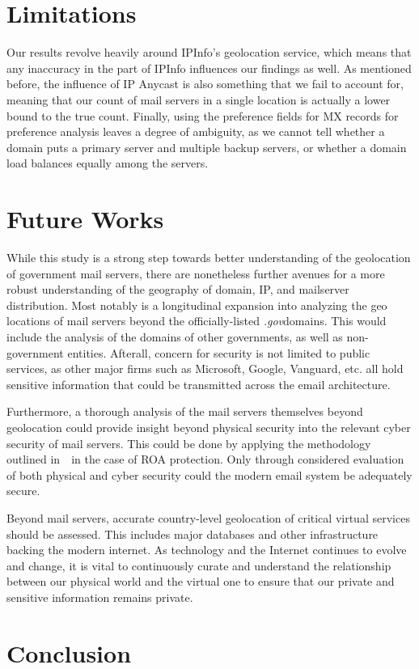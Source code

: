 \documentclass{hotnets21}
\newcommand{\dotgov}{\textit{.gov}\space}
\begin{document}
\section{Limitations}

Our results revolve heavily around IPInfo’s geolocation service, which means that any inaccuracy in the part of IPInfo influences our findings as well.
As mentioned before, the influence of IP Anycast is also something that we fail to account for, meaning that our count of mail servers in a single location is actually a lower bound to the true count.
Finally, using the preference fields for MX records for preference analysis leaves a degree of ambiguity, as we cannot tell whether a domain puts a primary server and multiple backup servers, or whether a domain load balances equally among the servers.

\section{Future Works}

While this study is a strong step towards better understanding of the geolocation of government mail servers, there are nonetheless further avenues for a more robust understanding of the geography of domain, IP, and mailserver distribution.
Most notably is a longitudinal expansion into analyzing the geo locations of mail servers beyond the officially-listed \dotgov domains.
This would include the analysis of the domains of other governments, as well as non-government entities.
Afterall, concern for security is not limited to public services, as other major firms such as Microsoft, Google, Vanguard, etc. all hold sensitive information that could be transmitted across the email architecture.

Furthermore, a thorough analysis of the mail servers themselves beyond geolocation could provide insight beyond physical security into the relevant cyber security of mail servers.
This could be done by applying the methodology outlined in~\cite{bartoli}~in the case of ROA protection.
Only through considered evaluation of both physical and cyber security could the modern email system be adequately secure.

Beyond mail servers, accurate country-level geolocation of critical virtual services should be assessed.
This includes major databases and other infrastructure backing the modern internet.
As technology and the Internet continues to evolve and change, it is vital to continuously curate and understand the relationship between our physical world and the virtual one to ensure that our private and sensitive information remains private.

\section{Conclusion}


 
\begin{small}

\end{small}
\end{document}
